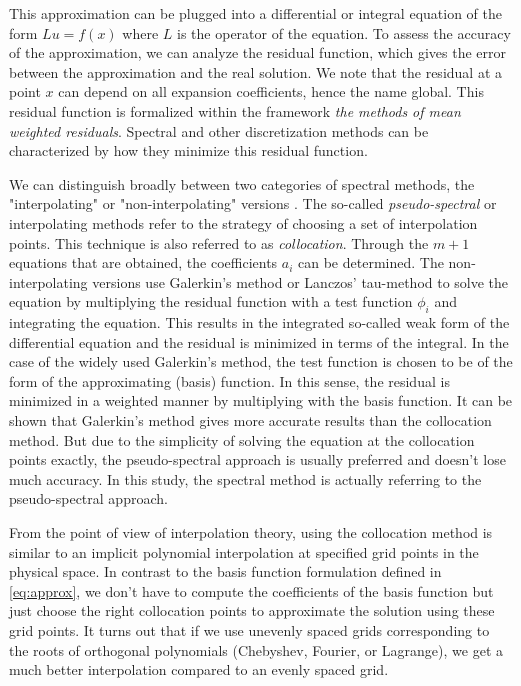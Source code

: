 This approximation can be plugged into a differential or integral equation of
the form $Lu=f(x)$ where $L$ is the operator of the equation. To assess the
accuracy of the approximation, we can analyze the residual function, which
gives the error between the approximation and the real solution. We note that
the residual at a point $x$ can depend on all expansion coefficients, hence the
name global. This residual function is formalized within the framework
\emph{the methods of mean weighted residuals}. Spectral and other
discretization methods can be characterized by how they minimize this residual
function. 

We can distinguish broadly between two categories of spectral methods, the
"interpolating" or "non-interpolating" versions \citep{boyd2001}. The so-called
\emph{pseudo-spectral} or interpolating methods refer to the strategy of
choosing a set of interpolation points. This technique is also referred to as
\emph{collocation}. Through the $m+1$ equations that are obtained, the
coefficients $a_i$ can be determined. The non-interpolating versions use
Galerkin's method or Lanczos' tau-method to solve the equation by multiplying
the residual function with a test function $\phi_i$ and integrating the
equation. This results in the integrated so-called weak form of the
differential equation and the residual is minimized in terms of the integral.
In the case of the widely used Galerkin's method, the test function is chosen
to be of the form of the approximating (basis) function. In this sense, the
residual is minimized in a weighted manner by multiplying with the basis
function. It can be shown that Galerkin's method gives more accurate results
than the collocation method. But due to the simplicity of solving the equation
at the collocation points exactly, the pseudo-spectral approach is usually
preferred and doesn't lose much accuracy. In this study, the spectral method is
actually referring to the pseudo-spectral approach.

From the point of view of interpolation theory, using the collocation method is
similar to an implicit polynomial interpolation at specified grid points in the
physical space. In contrast to the basis function formulation defined in
\eqref{eq:approx}, we don't have to compute the coefficients of the basis
function but just choose the right collocation points to approximate the
solution using these grid points. It turns out that if we use unevenly spaced
grids corresponding to the roots of orthogonal polynomials (Chebyshev, Fourier,
or Lagrange), we get a much better interpolation compared to an evenly spaced
grid.

